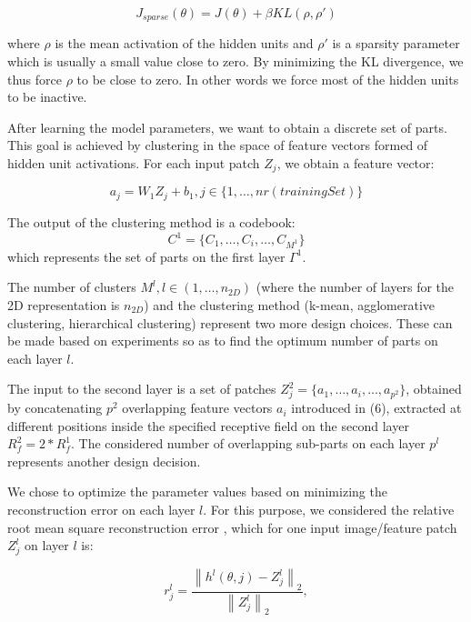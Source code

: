 \documentclass[runningheads]{llncs}
\begin{document}
\begin{equation}
J_{sparse}(\theta)=J(\theta)+\beta KL(\rho,\rho \prime)
\end{equation}

where $\rho$ is the mean activation of the hidden units and $\rho \prime$ is a sparsity parameter which is usually a small value close to zero. By minimizing the KL divergence, we thus force $\rho$ to be close to zero. In other words we force most of the hidden units to be inactive.

After learning the model parameters, we want to obtain a discrete set of parts. This goal is achieved by clustering in the space of feature vectors formed of hidden unit activations. For each input patch $Z_j$, we obtain a feature vector:

\begin{equation}
a_j=W_1Z_j+b_1, j\in\{1,\ldots,nr(trainingSet)\}
\end{equation}

The output of the clustering method is a codebook:
\begin{equation}
C^1=\{C_1,\ldots,C_i,\ldots,C_{M^1}\}
\end{equation}
which represents the set of parts on the first layer $\Gamma^{1}$. 

The number of clusters $M^l, l\in (1,\ldots,n_{2D})$ (where the number of layers for the 2D representation is $n_{2D}$) and the clustering method (k-mean, agglomerative clustering, hierarchical clustering) represent two more design choices. These can be made based on experiments so as to find the optimum number of parts on each layer $l$. 

The input to the second layer is a set of patches $Z_j^2=\{a_1,\ldots,a_i,\ldots,a_{p^2}\}$, obtained by concatenating  $p^2$ overlapping feature vectors $a_i$ introduced in (6), extracted at different positions inside the specified receptive field on the second layer $R_f^2=2*R_f^1$. The considered number of overlapping sub-parts on each layer $p^l$ represents another design decision.

We chose to optimize the parameter values based on minimizing the reconstruction error on each layer $l$. For this purpose, we considered the relative root mean square reconstruction error \cite{Chai2014}, which for one input image/feature patch $Z_j^l$ on layer $l$ is:

\begin{equation}
 r_j^l = \frac{\left\|h^l(\theta,j)-Z_j^l\right\|_2}{\left\|Z_j^l\right\|_2},
\end{equation}
\end{document}
